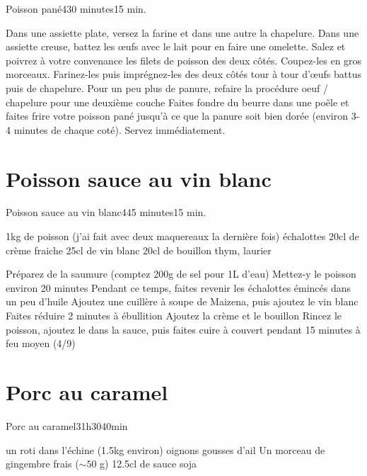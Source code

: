 {\begin{recette}{Poisson pané}{4}{30 minutes}{15 min.}
\begin{preparation}
\etape Dans une assiette plate, versez la farine et dans une autre la chapelure. Dans une assiette creuse, battez les œufs avec le lait pour en faire une omelette.
\etape Salez et poivrez à votre convenance les filets de poisson des deux côtés. Coupez-les en gros morceaux. Farinez-les puis imprégnez-les des deux côtés tour à tour d'œufs battus puis de chapelure.
\etape [optionnel] Pour un peu plus de panure, refaire la procédure oeuf / chapelure pour une deuxième couche
\etape Faites fondre du beurre dans une poêle et faites frire votre poisson pané jusqu'à ce que la panure soit bien dorée (environ 3-4 minutes de chaque coté). Servez immédiatement.
\end{preparation}
\end{recette}

\section{Poisson sauce au vin blanc}
\begin{recette}{Poisson sauce au vin blanc}{4}{45 minutes}{15 min.}
\begin{ingredients}
\ingredient 1kg de poisson (j'ai fait avec deux maquereaux la dernière fois)
 échalottes
\ingredient 20cl de crème fraiche
\ingredient 25cl de vin blanc
\ingredient 20cl de bouillon
\ingredient thym, laurier
\end{ingredients}

\begin{preparation}
\etape Préparez de la saumure (comptez 200g de sel pour 1L d'eau)
\etape Mettez-y le poisson environ 20 minutes
\etape Pendant ce temps, faites revenir les échalottes émincés dans un peu d'huile
\etape Ajoutez une cuillère à soupe de Maizena, puis ajoutez le vin blanc
\etape Faites réduire 2 minutes à ébullition
\etape Ajoutez la crème et le bouillon
\etape Rincez le poisson, ajoutez le dans la sauce, puis faites cuire à couvert pendant 15 minutes à feu moyen (4/9)
\end{preparation}
\end{recette}

\section{Porc au caramel}
\begin{recette}{Porc au caramel}{3}{1h30}{40min}
\begin{ingredients}
\ingredient un roti dans l'échine (1.5kg environ)
 oignons
 gousses d'ail
\ingredient Un morceau de gingembre frais ($\sim 50$ g)
\ingredient 12.5cl de sauce soja


\end{ingredients}
\end{recette}}
